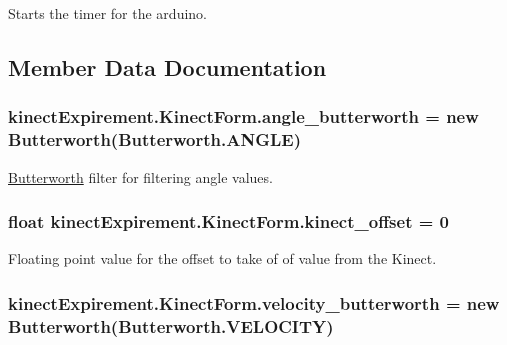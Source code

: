 Starts the timer for the arduino. 



\subsection{Member Data Documentation}
\subsubsection[{\texorpdfstring{angle\+\_\+butterworth}{angle_butterworth}}]{ kinect\+Expirement.\+Kinect\+Form.\+angle\+\_\+butterworth = new {\bf Butterworth}({\bf Butterworth.\+A\+N\+G\+LE})}\hypertarget{classkinect_expirement_1_1_kinect_form_abec90e6db4a70d6cccc38f90f800e3ab}{}\label{classkinect_expirement_1_1_kinect_form_abec90e6db4a70d6cccc38f90f800e3ab}


\hyperlink{classkinect_expirement_1_1_butterworth}{Butterworth} filter for filtering angle values. 

\subsubsection[{\texorpdfstring{kinect\+\_\+offset}{kinect_offset}}]{\setlength{\rightskip}{0pt plus 5cm}float kinect\+Expirement.\+Kinect\+Form.\+kinect\+\_\+offset = 0}\hypertarget{classkinect_expirement_1_1_kinect_form_a97a0dd9256e1093328fafccaca672398}{}\label{classkinect_expirement_1_1_kinect_form_a97a0dd9256e1093328fafccaca672398}


Floating point value for the offset to take of of value from the Kinect. 

\subsubsection[{\texorpdfstring{velocity\+\_\+butterworth}{velocity_butterworth}}]{ kinect\+Expirement.\+Kinect\+Form.\+velocity\+\_\+butterworth = new {\bf Butterworth}({\bf Butterworth.\+V\+E\+L\+O\+C\+I\+TY})}\hypertarget{classkinect_expirement_1_1_kinect_form_a7f1502bd90febb3137d8e4fdf71d52ec}{}\label{classkinect_expirement_1_1_kinect_form_a7f1502bd90febb3137d8e4fdf71d52ec}


